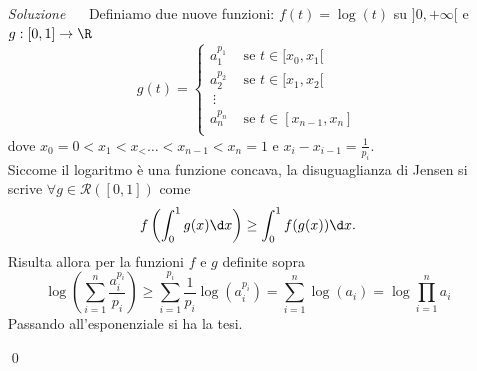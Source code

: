 \documentclass{article}
\newcommand{\se}{\text{ se }}
\begin{document}
\begin{enumerate}[label=\textbf{Esercizio 12.\arabic*.},itemindent=*]
\item[\textit{\large Soluzione~}]~
    Definiamo due nuove funzioni: $f(t)=\log(t)$ su $]0,+\infty[$ e $g:[0,1]\to \R$ 
    \[g(t)=\begin{cases}
        a_1^{p_1} &\se t \in[x_0, x_1[\\
        a_2^{p_2} &\se t \in [x_1, x_2[\\
        \:\vdots\\
        a_n^{p_n} &\se t \in [x_{n-1}, x_n]\\
    \end{cases}\]
    dove $x_0=0<x_1<x_<\dots<x_{n-1}<x_n=1$ e $x_i-x_{i-1}=\frac{1}{p_i}$.\\
    Siccome il logaritmo è una funzione concava, la disuguaglianza di Jensen si scrive $\forall g\in \mathcal{R}([0,1])$ come 
    \[f\left( \int_0^1 g(x)\d x\right)\geq\int_0^1f(g(x))\d x.\]
    Risulta allora per la funzioni $f$ e $g$ definite sopra
    \[\log\left( \sum_{i=1}^n\frac{a_i^{p_i}}{p_i} \right)\geq \sum_{i=1}^{p_i}\frac{1}{p_i}\log(a_i^{p_i})=\sum_{i=1}^n\log(a_i)=\log{\prod_{i=1}^n}a_i\]
    Passando all'esponenziale si ha la tesi.
\begin{flushright}
    \qed
\end{flushright}
\end{enumerate}
\end{document}
